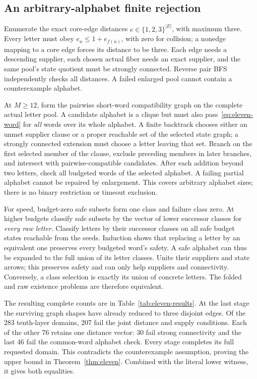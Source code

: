 \documentclass[10pt]{article}
\begin{document}
\subsection{An arbitrary-alphabet finite rejection}
Enumerate the exact core-edge distances $e\in\{1,2,3\}^{|E|}$, with maximum
three. Every letter must obey $e_u\le1+e_{f(u)}$, with zero for collision;
a nonedge mapping to a core edge forces its distance to be three.
Each edge needs a descending supplier, each chosen actual fiber needs an
exact supplier, and the same pool's state quotient must be strongly
connected. Reverse pair BFS independently checks all distances.
A failed enlarged pool cannot contain a counterexample alphabet.

At $M\ge12$, form the pairwise short-word compatibility graph on the
complete actual letter pool. A candidate alphabet is a clique but must
also pass~\eqref{eq:eleven-word} for \emph{all} words over its whole alphabet.
A finite backtrack chooses either an unmet supplier clause or a proper
reachable set of the selected state graph; a strongly connected extension
must choose a letter leaving that set. Branch on the first selected member
of the clause, exclude preceding members in later branches, and intersect
with pairwise-compatible candidates. After each addition beyond two
letters, check all budgeted words of the selected alphabet. A failing
partial alphabet cannot be repaired by enlargement. This covers arbitrary
alphabet sizes; there is no binary restriction or timeout exclusion.

For speed, budget-zero safe subsets form one class and failure class zero.
At higher budgets classify safe subsets by the vector of lower successor
classes for \emph{every raw letter}. Classify letters by their successor
classes on all safe budget states reachable from the seeds. Induction
shows that replacing a letter by an equivalent one preserves every
budgeted word's safety. A safe alphabet can thus be expanded to the full
union of its letter classes. Unite their suppliers and state arrows;
this preserves safety and can only help suppliers and connectivity.
Conversely, a class selection is exactly its union of concrete letters.
The folded and raw existence problems are therefore equivalent.

The resulting complete counts are in Table~\ref{tab:eleven-results}.
At the last stage the surviving graph shapes have already reduced to
three disjoint edges. Of the 283 tenth-layer domains, 207 fail the joint
distance and supply conditions. Each of the other 76 retains one distance
vector: 30 fail strong connectivity and the last 46 fail the common-word
alphabet check.
Every stage completes its full requested domain. This
contradicts the counterexample assumption, proving the upper bound in
Theorem~\ref{thm:eleven}. Combined with the literal lower witness, it gives
both equalities.
\end{document}
